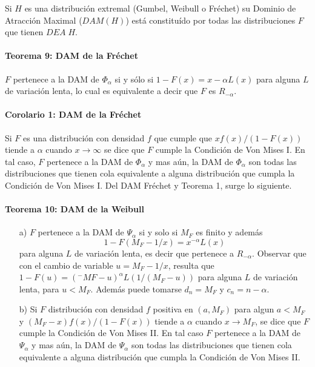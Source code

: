 \documentclass[
  oneside]{book}
\begin{document}
Si \(H\) es una distribución extremal (Gumbel, Weibull o Fréchet) su
Dominio de Atracción Maximal (\(DAM(H)\)) está constituído por todas las
distribuciones \(F\) que tienen \(DEA\;H\).

\hypertarget{teorema-9-dam-de-la-fruxe9chet}{%
\paragraph{Teorema 9: DAM de la
Fréchet}\label{teorema-9-dam-de-la-fruxe9chet}}

\(F\) pertenece a la DAM de \(\Phi_{\alpha}\) si y sólo si
\(1-F(x)=x-\alpha L(x)\) para alguna \(L\) de variación lenta, lo cual
es equivalente a decir que \(F\) es \(R_{-\alpha}\).

\hypertarget{corolario-1-dam-de-la-fruxe9chet}{%
\paragraph{Corolario 1: DAM de la
Fréchet}\label{corolario-1-dam-de-la-fruxe9chet}}

Si \(F\) es una distribución con densidad \(f\) que cumple que
\(xf(x)/(1-F(x))\) tiende a \(\alpha\) cuando \(x \rightarrow \infty\)
se dice que \(F\) cumple la Condición de Von Mises I. En tal caso, \(F\)
pertenece a la DAM de \(\Phi_{\alpha}\) y mas aún, la DAM de
\(\Phi_{\alpha}\) son todas las distribuciones que tienen cola
equivalente a alguna distribución que cumpla la Condición de Von Mises
I. Del DAM Fréchet y Teorema 1, surge lo siguiente.

\hypertarget{teorema-10-dam-de-la-weibull}{%
\paragraph{Teorema 10: DAM de la
Weibull}\label{teorema-10-dam-de-la-weibull}}

\begin{itemize}
\item [a)] $F$ pertenece a la DAM de $\Psi_{\alpha}$ si y solo si $M_F$ es finito y además $$1-F(M_F -1/x)=x^{-\alpha} L(x)$$ para alguna
$L$ de variación lenta, es decir que pertenece a $R_{-\alpha}$. Observar que con el cambio de variable $u=M_F -1/x$,
resulta que $1-F(u)=(^{-}MF -u)^{\alpha} L(1/(M_F -u))$ para alguna $L$ de variación lenta, para $u< M_F$. Además puede tomarse $d_n= M_F$ y $c_n= n-\alpha$.
\item [b)] Si $F$ distribución con densidad $f$ positiva en $(a,M_F)$ para algun $a< M_F$ y $(M_F -x)f(x)/(1-F(x))$ tiende a $\alpha$ cuando $x\rightarrow M_F$, se dice que $F$ cumple la Condición de Von Mises II. En tal caso $F$ pertenece a la DAM de $\Psi_{\alpha}$ y mas aún, la DAM de $\Psi_{\alpha}$ son todas las distribuciones que tienen cola equivalente a alguna distribución que cumpla la Condición de Von Mises II.
\end{itemize}
\end{document}
